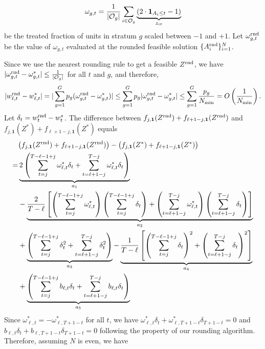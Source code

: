 				\[\omega_{g,t} = \frac{1}{|\mathcal{O}_g|} \sum_{i \in \mathcal{O}_g} \underbrace{(2 \cdot \boldsymbol{1}_{A_i \leq t} - 1)}_{z_{it}} \]
				be the treated fraction of units in stratum $g$ scaled between $-1$ and $+1$. Let $\omega_{g,t}^{\textnormal{rnd}}$ be the value of $\omega_{g,t}$ evaluated at the rounded feasible solution $\{A^{\textnormal{rnd}}_i\}_{i=1}^N$. 
				
				
				Since we use the nearest rounding rule to get a feasible $Z^{\textnormal{rnd}}$, we have $|\omega^{\textnormal{rnd}}_{g,t} -  \omega^\ast_{g,t}| \leq \frac{1}{|\mathcal{O}_g|}$ for all $t$ and $g$, and therefore,
		\[|w^{\textnormal{rnd}}_{\ell,t} - w^\ast_{\ell,t}| = |\sum_{g = 1}^G p_g (\omega^{\textnormal{rnd}}_{g,t} - \omega^\ast_{g,t}) | \leq \sum_{g = 1}^G p_g |\omega^{\textnormal{rnd}}_{g,t} -\omega^\ast_{g,t}|  \leq \sum_{g = 1}^G \frac{p_g }{N_{\min}} = O\left(\frac{1}{N_{\min}} \right). \]
		Let $\delta_t = w^{\textnormal{rnd}}_{t} - w^\ast_t$.
		The difference between $f_{j,\bm{1}}(Z^{\textnormal{rnd}})+f_{\ell+1-j,\bm{1}}(Z^{\textnormal{rnd}})$ and $f_{j,\bm{1}}(Z^\ast)+f_{\ell+1-j,\bm{1}}(Z^\ast)$ equals
		\begin{align*}
		    & \big(f_{j,\bm{1}}(Z^{\textnormal{rnd}})+f_{\ell+1-j,\bm{1}}(Z^{\textnormal{rnd}}) \big) - \big(f_{j,\bm{1}}(Z^\ast)+f_{\ell+1-j,\bm{1}}(Z^\ast) \big) \\
		    =& \underbrace{2 \left( \sum_{t = j}^{T - \ell-1+j} \omega^\ast_{\ell,t} \delta_t + \sum_{t = \ell+1-j}^{T - j} \omega^\ast_{\ell,t} \delta_t \right)}_{a_1} \\
      & - \underbrace{\frac{2}{T-\ell} \left[ \left( \sum_{t = j}^{T - \ell-1+j} \omega^\ast_{\ell,t} \right) \left( \sum_{t = j}^{T - \ell-1+j} \delta_t \right) +  \left( \sum_{t = \ell+1-j}^{T - j} \omega^\ast_{\ell,t} \right) \left( \sum_{t = \ell+1-j}^{T - j} \delta_t \right) \right]}_{a_2}  \\
		    & + \underbrace{ \left( \sum_{t = j}^{T - \ell-1+j} \delta^2_t + \sum_{t = \ell+1-j}^{T - j}  \delta^2_t \right)}_{a_3}  -  \underbrace{\frac{1}{T-\ell} \left[  \left( \sum_{t = j}^{T - \ell-1+j} \delta_t \right)^2 +   \left( \sum_{t = \ell+1-j}^{T - j} \delta_t \right)^2 \right]}_{a_4}   \\
		    & + \underbrace{\left(\sum_{t = j}^{T - \ell-1+j}  b_{\ell,t} \delta_t + \sum_{t = \ell+1-j}^{T - j}b_{\ell,t} \delta_t  \right)}_{a_5} 
		\end{align*}
		Since $\omega^\ast_{\ell,t} = - \omega^\ast_{\ell,T+1-t}$ for all $t$, we have $\omega^\ast_{\ell,t} \delta_t  + \omega^\ast_{\ell,T+1-t} \delta_{T+1-t} = 0$ and $b_{\ell,t} \delta_t  + b_{\ell,T+1-t} \delta_{T+1-t} = 0$ following the property of our rounding algorithm. Therefore, assuming $N$ is even, we have
